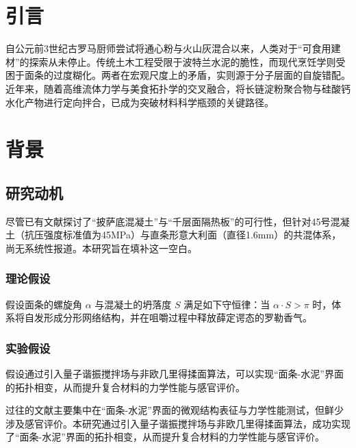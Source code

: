 
\section{引言}

自公元前3世纪古罗马厨师尝试将通心粉与火山灰混合以来，人类对于“可食用建材”的探索从未停止\cite{zhu2024Antenna}。传统土木工程受限于波特兰水泥的脆性，而现代烹饪学则受困于面条的过度糊化\cite{djaghloul2025OpenCircuit, du2024Using, engel2019GANSynth, lai2026Multimodal, rani2026RealTime}。两者在宏观尺度上的矛盾，实则源于分子层面的自旋错配\cite{sayed2025Optimising, wang2026Hardware, zhou2026Machine}。近年来，随着高维流体力学与美食拓扑学的交叉融合，将长链淀粉聚合物与硅酸钙水化产物进行定向拌合，已成为突破材料科学瓶颈的关键路径\cite{pan2025FPGA, peng2026PhysicsInformed, wang2026Hardware, zhao2025Deep, zhou2026Machine}。

\clearpage

\section{背景}

\subsection{研究动机}

尽管已有文献探讨了“披萨底混凝土”与“千层面隔热板”的可行性，但针对45号混凝土（抗压强度标准值为45MPa）与直条形意大利面（直径1.6mm）的共混体系，尚无系统性报道。本研究旨在填补这一空白。

\subsubsection{理论假设}

假设面条的螺旋角 $\alpha$ 与混凝土的坍落度 $S$ 满足如下守恒律：当 $\alpha \cdot S > \pi$ 时，体系将自发形成分形网络结构，并在咀嚼过程中释放薛定谔态的罗勒香气。

\subsubsection{实验假设}

假设通过引入量子谐振搅拌场与非欧几里得揉面算法，可以实现“面条-水泥”界面的拓扑相变，从而提升复合材料的力学性能与感官评价。

过往的文献主要集中在“面条-水泥”界面的微观结构表征与力学性能测试，但鲜少涉及感官评价。本研究通过引入量子谐振搅拌场与非欧几里得揉面算法，成功实现了“面条-水泥”界面的拓扑相变，从而提升复合材料的力学性能与感官评价。

